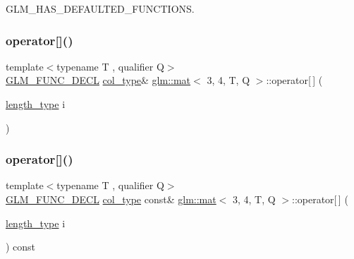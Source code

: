 G\+L\+M\+\_\+\+H\+A\+S\+\_\+\+D\+E\+F\+A\+U\+L\+T\+E\+D\+\_\+\+F\+U\+N\+C\+T\+I\+O\+NS. 

\mbox{\label{structglm_1_1mat_3_013_00_014_00_01_t_00_01_q_01_4_a2cc3ce3e5d6807a9ec433b51f16ecd8a}} 
\subsubsection{\texorpdfstring{operator[]()}{operator[]()}\hspace{0.1cm}{\footnotesize\ttfamily [1/2]}}
{\footnotesize\ttfamily template$<$typename T , qualifier Q$>$ \\
\mbox{\hyperlink{setup_8hpp_ab2d052de21a70539923e9bcbf6e83a51}{G\+L\+M\+\_\+\+F\+U\+N\+C\+\_\+\+D\+E\+CL}} \mbox{\hyperlink{structglm_1_1mat_3_013_00_014_00_01_t_00_01_q_01_4_aaa23c4674cbe2dc1eda1d826b8ef721e}{col\+\_\+type}}\& \mbox{\hyperlink{structglm_1_1mat}{glm\+::mat}}$<$ 3, 4, T, Q $>$\+::operator\mbox{[}$\,$\mbox{]} (\begin{DoxyParamCaption}\item[{\mbox{\hyperlink{structglm_1_1mat_3_013_00_014_00_01_t_00_01_q_01_4_a6a07c3870b8e6d4ba5f1ec8fa988d9bf}{length\+\_\+type}}}]{i }\end{DoxyParamCaption})}

\mbox{\label{structglm_1_1mat_3_013_00_014_00_01_t_00_01_q_01_4_a1abef793b9078730b053df8ff6a37256}} 
\subsubsection{\texorpdfstring{operator[]()}{operator[]()}\hspace{0.1cm}{\footnotesize\ttfamily [2/2]}}
{\footnotesize\ttfamily template$<$typename T , qualifier Q$>$ \\
\mbox{\hyperlink{setup_8hpp_ab2d052de21a70539923e9bcbf6e83a51}{G\+L\+M\+\_\+\+F\+U\+N\+C\+\_\+\+D\+E\+CL}} \mbox{\hyperlink{structglm_1_1mat_3_013_00_014_00_01_t_00_01_q_01_4_aaa23c4674cbe2dc1eda1d826b8ef721e}{col\+\_\+type}} const\& \mbox{\hyperlink{structglm_1_1mat}{glm\+::mat}}$<$ 3, 4, T, Q $>$\+::operator\mbox{[}$\,$\mbox{]} (\begin{DoxyParamCaption}\item[{\mbox{\hyperlink{structglm_1_1mat_3_013_00_014_00_01_t_00_01_q_01_4_a6a07c3870b8e6d4ba5f1ec8fa988d9bf}{length\+\_\+type}}}]{i }\end{DoxyParamCaption}) const}



